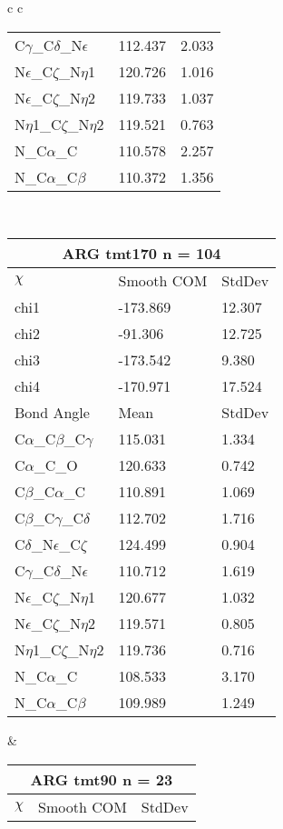\begin{longtable}{ c c }
\begin{tabular}{ l l l }
  C$\gamma$\_C$\delta$\_N$\epsilon$ & 112.437 & 2.033\\
  N$\epsilon$\_C$\zeta$\_N$\eta$1 & 120.726 & 1.016\\
  N$\epsilon$\_C$\zeta$\_N$\eta$2 & 119.733 & 1.037\\
  N$\eta$1\_C$\zeta$\_N$\eta$2 & 119.521 & 0.763\\
  N\_C$\alpha$\_C & 110.578 & 2.257\\
  N\_C$\alpha$\_C$\beta$ & 110.372 & 1.356\\
  \bottomrule
  \end{tabular}
  \\
  \begin{tabular}{ l l l }
  \toprule
  \multicolumn{3}{c}{ARG \textbf{tmt170} n = 104} \\ \toprule
  $\chi$       & Smooth COM & StdDev \\ \midrule
  chi1 & -173.869 & 12.307 \\ 
  chi2 & -91.306 & 12.725 \\ 
  chi3 & -173.542 & 9.380 \\ 
  chi4 & -170.971 & 17.524 \\ \midrule
  Bond Angle   & Mean     & StdDev \\ \midrule
  C$\alpha$\_C$\beta$\_C$\gamma$ & 115.031 & 1.334\\
  C$\alpha$\_C\_O & 120.633 & 0.742\\
  C$\beta$\_C$\alpha$\_C & 110.891 & 1.069\\
  C$\beta$\_C$\gamma$\_C$\delta$ & 112.702 & 1.716\\
  C$\delta$\_N$\epsilon$\_C$\zeta$ & 124.499 & 0.904\\
  C$\gamma$\_C$\delta$\_N$\epsilon$ & 110.712 & 1.619\\
  N$\epsilon$\_C$\zeta$\_N$\eta$1 & 120.677 & 1.032\\
  N$\epsilon$\_C$\zeta$\_N$\eta$2 & 119.571 & 0.805\\
  N$\eta$1\_C$\zeta$\_N$\eta$2 & 119.736 & 0.716\\
  N\_C$\alpha$\_C & 108.533 & 3.170\\
  N\_C$\alpha$\_C$\beta$ & 109.989 & 1.249\\
  \bottomrule
  \end{tabular}
  &
  \begin{tabular}{ l l l }
  \toprule
  \multicolumn{3}{c}{ARG \textbf{tmt90} n = 23} \\ \toprule
  $\chi$       & Smooth COM & StdDev \\ \midrule

\end{tabular}
\end{longtable}
